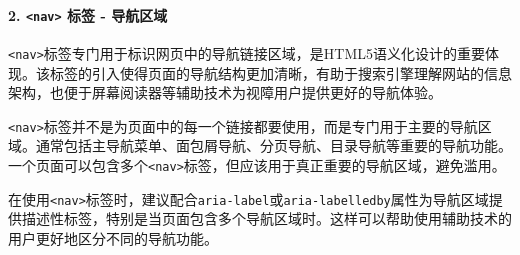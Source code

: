 \begin{Shaded}
\begin{Highlighting}[]
\DataTypeTok{\textless{}}\DataTypeTok{\textgreater{}}
    \DataTypeTok{\textless{}}\DataTypeTok{\textgreater{}}\DataTypeTok{\textless{}/}\DataTypeTok{\textgreater{}}
    \DataTypeTok{\textless{}}\DataTypeTok{\textgreater{}}\DataTypeTok{\textless{}/}\DataTypeTok{\textgreater{}}
\DataTypeTok{\textless{}/}\DataTypeTok{\textgreater{}}

\DataTypeTok{\textless{}}\DataTypeTok{\textgreater{}}
    \DataTypeTok{\textless{}}\DataTypeTok{\textgreater{}}
        \DataTypeTok{\textless{}}\DataTypeTok{\textgreater{}}\DataTypeTok{\textless{}/}\DataTypeTok{\textgreater{}}
        \DataTypeTok{\textless{}}\DataTypeTok{\textgreater{}}\DataTypeTok{\textless{}/}\DataTypeTok{\textgreater{}}
    \DataTypeTok{\textless{}/}\DataTypeTok{\textgreater{}}
\DataTypeTok{\textless{}/}\DataTypeTok{\textgreater{}}
\end{Highlighting}
\end{Shaded}

\paragraph{\texorpdfstring{2. \texttt{\textless{}nav\textgreater{}} 标签 - 导航区域}{2. \textless nav\textgreater{} 标签 - 导航区域}}\label{nav-ux6807ux7b7e---ux5bfcux822aux533aux57df}

\texttt{\textless{}nav\textgreater{}}标签专门用于标识网页中的导航链接区域，是HTML5语义化设计的重要体现。该标签的引入使得页面的导航结构更加清晰，有助于搜索引擎理解网站的信息架构，也便于屏幕阅读器等辅助技术为视障用户提供更好的导航体验。

\texttt{\textless{}nav\textgreater{}}标签并不是为页面中的每一个链接都要使用，而是专门用于主要的导航区域。通常包括主导航菜单、面包屑导航、分页导航、目录导航等重要的导航功能。一个页面可以包含多个\texttt{\textless{}nav\textgreater{}}标签，但应该用于真正重要的导航区域，避免滥用。

在使用\texttt{\textless{}nav\textgreater{}}标签时，建议配合\texttt{aria-label}或\texttt{aria-labelledby}属性为导航区域提供描述性标签，特别是当页面包含多个导航区域时。这样可以帮助使用辅助技术的用户更好地区分不同的导航功能。

